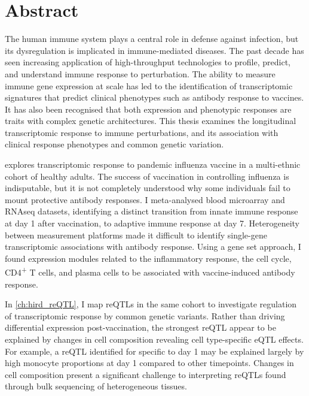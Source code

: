 %
%

\chapter{Abstract}

The human immune system plays a central role in defense against infection, 
but its dysregulation is implicated in immune-mediated diseases.
The past decade has seen increasing application of high-throughput technologies to profile, predict, and understand immune response to perturbation.
The ability to measure immune gene expression at scale has led to the identification of 
transcriptomic signatures that predict clinical phenotypes such as antibody response to vaccines.
It has also been recognised that both expression and phenotypic responses are traits with complex genetic architectures.
This thesis examines the longitudinal transcriptomic response to immune perturbations,
and its association with clinical response phenotypes and common genetic variation.

 explores transcriptomic response to pandemic influenza vaccine in a multi-ethnic cohort of healthy adults.
The success of vaccination in controlling influenza is indisputable, 
but it is not completely understood why some individuals fail to mount protective antibody responses.
I meta-analysed blood microarray and \gls{RNAseq} datasets, 
identifying a distinct transition from innate immune response at day 1 after vaccination, to adaptive immune response at day 7.
Heterogeneity between measurement platforms made it difficult to identify single-gene transcriptomic associations with antibody response.
Using a gene set approach, I found expression modules related to the inflammatory response, the cell cycle, CD4\textsuperscript{+} T cells, and plasma cells 
to be associated with vaccine-induced antibody response.

In \cref{ch:hird_reQTL}, I map \glspl{reQTL} in the same cohort to investigate regulation of transcriptomic response by common genetic variants.
Rather than driving differential expression post-vaccination,
the strongest \gls{reQTL} appear to be explained by changes in cell composition revealing cell type-specific \gls{eQTL} effects.
For example, a \gls{reQTL} identified for  specific to day 1 may be explained largely by high monocyte proportions at day 1 compared to other timepoints.
Changes in cell composition present a significant challenge to interpreting \glspl{reQTL} found through bulk sequencing of heterogeneous tissues.

